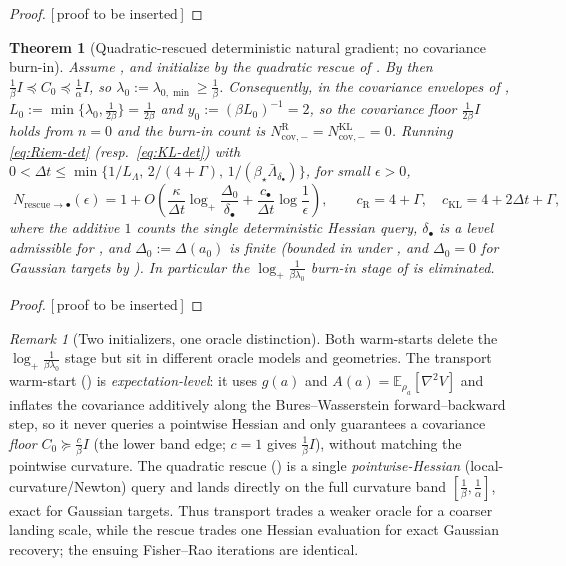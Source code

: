 \documentclass[11pt]{article}
\theoremstyle{plain}
\newtheorem{theorem}{Theorem}[section]
\theoremstyle{definition}
\theoremstyle{remark}
\newtheorem{remark}[remark]{Remark}
\newcommand{\E}{\mathbb{E}}
\newcommand{\KL}{\mathrm{KL}}
\newcommand{\Id}{I}
\newcommand{\Riem}{\mathrm{R}}
\newcommand{\logp}{\log_+}
\newcommand{\LB}{L_\Lambda}
\newcommand{\PROOFHOLE}{{\color{red}\textsf{[\,proof to be inserted\,]}}}
\begin{document}
\begin{proof}
\PROOFHOLE
\end{proof}

\begin{theorem}[Quadratic-rescued deterministic natural gradient; no covariance burn-in]
\label{thm:disc-rescue-to-FR}
Assume , and initialize by the quadratic rescue of
. By  then $\tfrac1\beta\Id\preceq C_0\preceq\tfrac1\alpha\Id$,
so $\lambda_0:=\lambda_{0,\min}\geq\tfrac1\beta$. Consequently, in the covariance envelopes of
, $L_0:=\min\{\lambda_0,\tfrac1{2\beta}\}=\tfrac1{2\beta}$ and
$y_0:=(\beta L_0)^{-1}=2$, so the covariance floor $\tfrac1{2\beta}\Id$ holds from $n=0$ and the
burn-in count is $N_{\mathrm{cov},-}^{\Riem}=N_{\mathrm{cov},-}^{\KL}=0$. Running \eqref{eq:Riem-det}
(resp.\ \eqref{eq:KL-det}) with
$0<\Delta t\leq\min\{1/\LB,\,2/(4+\Gamma),\,1/(\beta_\star\bar\Lambda_{\delta_\bullet})\}$, for small
$\epsilon>0$,
\[
    \boxed{\;
    N_{\mathrm{rescue}\to\bullet}(\epsilon)
    =1
    +O\!\left(\frac\kappa{\Delta t}\logp\frac{\Delta_0}{\delta_\bullet}
    +\frac{c_\bullet}{\Delta t}\log\frac1\epsilon\right),
    \qquad
    c_{\Riem}=4+\Gamma,\quad c_{\KL}=4+2\Delta t+\Gamma,
    \;}
\]
where the additive $1$ counts the single deterministic Hessian query, $\delta_\bullet$ is a level
admissible for , and $\Delta_0:=\Delta(a_0)$ is finite (bounded in
 under , and $\Delta_0=0$ for Gaussian targets
by ). In particular the $\logp\tfrac1{\beta\lambda_0}$ burn-in stage of
 is eliminated.
\end{theorem}

\begin{proof}
\PROOFHOLE
\end{proof}

\begin{remark}[Two initializers, one oracle distinction]
\label{rem:two-initializers}
Both warm-starts delete the $\logp\tfrac1{\beta\lambda_0}$ stage but sit in different oracle models
and geometries. The transport warm-start () is \emph{expectation-level}: it
uses $g(a)$ and $A(a)=\E_{\rho_a}[\nabla^2V]$ and inflates the covariance additively along the
Bures--Wasserstein forward--backward step, so it never queries a pointwise Hessian and only guarantees
a covariance \emph{floor} $C_0\succeq\tfrac c\beta\Id$ (the lower band edge; $c=1$ gives $\tfrac1\beta\Id$),
without matching the pointwise curvature. The quadratic rescue () is a single
\emph{pointwise-Hessian} (local-curvature/Newton) query and lands directly on the full curvature
band $[\tfrac1\beta,\tfrac1\alpha]$, exact for Gaussian targets. Thus transport trades a weaker
oracle for a coarser landing scale, while the rescue trades one Hessian evaluation for exact
Gaussian recovery; the ensuing Fisher--Rao iterations are identical.
\end{remark}
\end{document}
